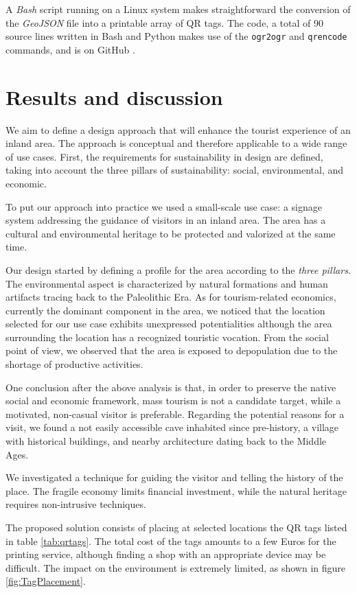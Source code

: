 \documentclass[sustainability,article,submit,pdftex,moreauthors]{Definitions/mdpi}
\begin{document}
A \emph{Bash} script running on a Linux system makes straightforward the conversion of the \emph{GeoJSON} file into a printable array of QR tags. The code, a total of 90 source lines written in Bash and Python makes use of the \texttt{ogr2ogr} and \texttt{qrencode} commands, and is on GitHub .

\section{Results and discussion \label{sec:results}}

We aim to define a design approach that will enhance the tourist experience of an inland area. The approach is conceptual and therefore applicable to a wide range of use cases. First, the requirements for sustainability in design are defined, taking into account the three pillars of sustainability: social, environmental, and economic.

To put our approach into practice we used a small-scale use case: a signage system addressing the guidance of visitors in an inland area. The area has a cultural and environmental heritage to be protected and valorized at the same time.

Our design started by defining a profile for the area according to the \emph{three pillars}. The environmental aspect is characterized by natural formations and human artifacts tracing back to the Paleolithic Era. As for tourism-related economics, currently the dominant component in the area, we noticed that the location selected for our use case exhibits unexpressed potentialities although the area surrounding the location has a recognized touristic vocation. From the social point of view, we observed that the area is exposed to depopulation due to the shortage of productive activities.

One conclusion after the above analysis is that, in order to preserve the native social and economic framework, mass tourism is not a candidate target, while a motivated, non-casual visitor is preferable. Regarding the potential reasons for a visit, we found a not easily accessible cave inhabited since pre-history, a village with historical buildings, and nearby architecture dating back to the Middle Ages.

We investigated a technique for guiding the visitor and telling the history of the place. The fragile economy limits financial investment, while the natural heritage requires non-intrusive techniques.

The proposed solution consists of placing at selected locations the QR tags listed in table \ref{tab:qrtags}. The total cost of the tags amounts to a few Euros for the printing service, although finding a shop with an appropriate device may be difficult. The impact on the environment is extremely limited, as shown in figure \ref{fig:TagPlacement}.
\end{document}
